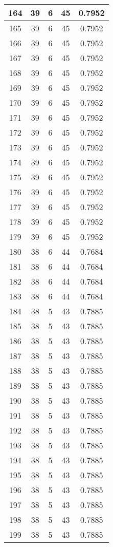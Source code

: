 \documentclass[letterpaper, 12pt]{article}
\begin{document}
\begin{longtable}{|c|c|c|c|c|}
\hline
164 & 39 & 6 & 45 & 0.7952 \\
\hline
165 & 39 & 6 & 45 & 0.7952 \\
\hline
166 & 39 & 6 & 45 & 0.7952 \\
\hline
167 & 39 & 6 & 45 & 0.7952 \\
\hline
168 & 39 & 6 & 45 & 0.7952 \\
\hline
169 & 39 & 6 & 45 & 0.7952 \\
\hline
170 & 39 & 6 & 45 & 0.7952 \\
\hline
171 & 39 & 6 & 45 & 0.7952 \\
\hline
172 & 39 & 6 & 45 & 0.7952 \\
\hline
173 & 39 & 6 & 45 & 0.7952 \\
\hline
174 & 39 & 6 & 45 & 0.7952 \\
\hline
175 & 39 & 6 & 45 & 0.7952 \\
\hline
176 & 39 & 6 & 45 & 0.7952 \\
\hline
177 & 39 & 6 & 45 & 0.7952 \\
\hline
178 & 39 & 6 & 45 & 0.7952 \\
\hline
179 & 39 & 6 & 45 & 0.7952 \\
\hline
180 & 38 & 6 & 44 & 0.7684 \\
\hline
181 & 38 & 6 & 44 & 0.7684 \\
\hline
182 & 38 & 6 & 44 & 0.7684 \\
\hline
183 & 38 & 6 & 44 & 0.7684 \\
\hline
184 & 38 & 5 & 43 & 0.7885 \\
\hline
185 & 38 & 5 & 43 & 0.7885 \\
\hline
186 & 38 & 5 & 43 & 0.7885 \\
\hline
187 & 38 & 5 & 43 & 0.7885 \\
\hline
188 & 38 & 5 & 43 & 0.7885 \\
\hline
189 & 38 & 5 & 43 & 0.7885 \\
\hline
190 & 38 & 5 & 43 & 0.7885 \\
\hline
191 & 38 & 5 & 43 & 0.7885 \\
\hline
192 & 38 & 5 & 43 & 0.7885 \\
\hline
193 & 38 & 5 & 43 & 0.7885 \\
\hline
194 & 38 & 5 & 43 & 0.7885 \\
\hline
195 & 38 & 5 & 43 & 0.7885 \\
\hline
196 & 38 & 5 & 43 & 0.7885 \\
\hline
197 & 38 & 5 & 43 & 0.7885 \\
\hline
198 & 38 & 5 & 43 & 0.7885 \\
\hline
199 & 38 & 5 & 43 & 0.7885 \\
\hline
\end{longtable}
\end{document}
